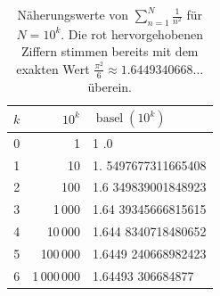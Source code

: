 \begin{table}
\def\korrekt#1{
\bgroup\color{darkred}#1\egroup
}
\centering
\begin{tabular}{r r l}
\hline
$k$ & $10^k$ & $\operatorname{basel}(10^k)$ \\
\hline
0 & 1           & \korrekt{1}.0 \\
1 & 10          & \korrekt{1.}5497677311665408 \\
2 & 100         & \korrekt{1.6}349839001848923 \\
3 & 1\,000      & \korrekt{1.64}39345666815615 \\
4 & 10\,000     & \korrekt{1.644}8340718480652 \\
5 & 100\,000    & \korrekt{1.6449}240668982423 \\
6 & 1\,000\,000 & \korrekt{1.64493}306684877 \\
\hline
\end{tabular}
\caption{Näherungswerte von $\sum_{n=1}^{N} \frac{1}{n^2}$ für $N = 10^k$.
Die \korrekt{rot hervorgehobenen} Ziffern stimmen bereits mit dem exakten Wert
$\frac{\pi^2}{6} \approx 1.6449340668\ldots$ überein.
\label{basel:tabelle:naeherung}}
\end{table}
